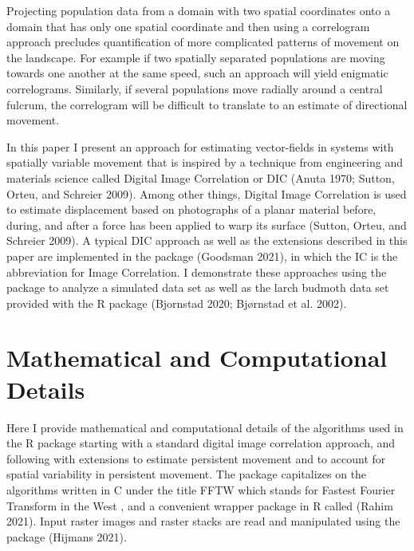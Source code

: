 Projecting population data from a domain with two spatial coordinates onto a domain that has only one spatial coordinate and then using a correlogram approach precludes quantification of more complicated patterns of movement on the landscape. For example if two spatially separated populations are moving towards one another at the same speed, such an approach will yield enigmatic correlograms. Similarly, if several populations move radially around a central fulcrum, the correlogram will be difficult to translate to an estimate of directional movement.

In this paper I present an approach for estimating vector-fields in systems with spatially variable movement that is inspired by a technique from engineering and materials science called Digital Image Correlation or DIC (Anuta 1970; Sutton, Orteu, and Schreier 2009). Among other things, Digital Image Correlation is used to estimate displacement based on photographs of a planar material before, during, and after a force has been applied to warp its surface (Sutton, Orteu, and Schreier 2009). A typical DIC approach as well as the extensions described in this paper are implemented in the  package (Goodsman 2021), in which the IC is the abbreviation for Image Correlation. I demonstrate these approaches using the  package to analyze a simulated data set as well as the larch budmoth data set provided with the  R package (Bjornstad 2020; Bjørnstad et al. 2002).

\hypertarget{mathematical-and-computational-details}{%
\section{Mathematical and Computational Details}\label{mathematical-and-computational-details}}

Here I provide mathematical and computational details of the algorithms used in the  R package starting with a standard digital image correlation approach, and following with extensions to estimate persistent movement and to account for spatial variability in persistent movement. The  package capitalizes on the algorithms written in C under the title FFTW which stands for Fastest Fourier Transform in the West \citep{FFTW2005}, and a convenient wrapper package in R called  (Rahim 2021). Input raster images and raster stacks are read and manipulated using the  package (Hijmans 2021).

